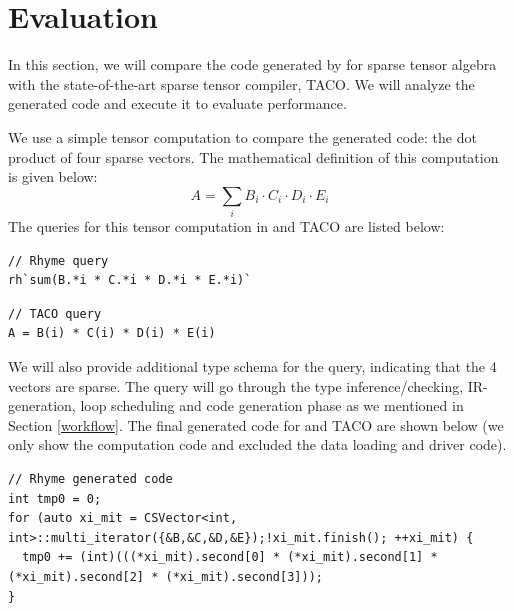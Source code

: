 \documentclass[acmsmall,nonacm]{acmart}\settopmatter{printfolios=true,printccs=false,printacmref=false}
\newcommand{\rhyme}{\text{Rhyme}\xspace}
\begin{document}
\section{Evaluation}\label{evaluation}

In this section, we will compare the code generated by \rhyme for sparse tensor algebra with the state-of-the-art sparse tensor compiler, TACO. We will analyze the generated code and execute it to evaluate performance.\par
We use a simple tensor computation to compare the generated code: the dot product of four sparse vectors. The mathematical definition of this computation is given below:
$$A = \sum_{i} B_i \cdot C_i \cdot D_i \cdot E_i$$
The queries for this tensor computation in \rhyme and TACO are listed below:\par
\vspace*{2mm}
\begin{minipage}{0.5\textwidth}
\begin{lstlisting}[basicstyle=\ttfamily\footnotesize]
// Rhyme query
rh`sum(B.*i * C.*i * D.*i * E.*i)`
\end{lstlisting}
\end{minipage}%
\begin{minipage}{0.5\textwidth}
\begin{lstlisting}[basicstyle=\ttfamily\footnotesize]
// TACO query
A = B(i) * C(i) * D(i) * E(i)
\end{lstlisting}
\end{minipage}

\vspace*{2mm}
\noindent
We will also provide additional type schema for the \rhyme query, indicating that the 4 vectors are sparse. The query will go through the type inference/checking, IR-generation, loop scheduling and code generation phase as we mentioned in Section \ref{workflow}. The final generated code for \rhyme and TACO are shown below (we only show the computation code and excluded the data loading and driver code).\par
\vspace*{2mm}
\noindent
\begin{lstlisting}[basicstyle=\ttfamily\footnotesize]
// Rhyme generated code
int tmp0 = 0;
for (auto xi_mit = CSVector<int, int>::multi_iterator({&B,&C,&D,&E});!xi_mit.finish(); ++xi_mit) {
  tmp0 += (int)(((*xi_mit).second[0] * (*xi_mit).second[1] * (*xi_mit).second[2] * (*xi_mit).second[3]));
}
\end{lstlisting}
\end{document}
